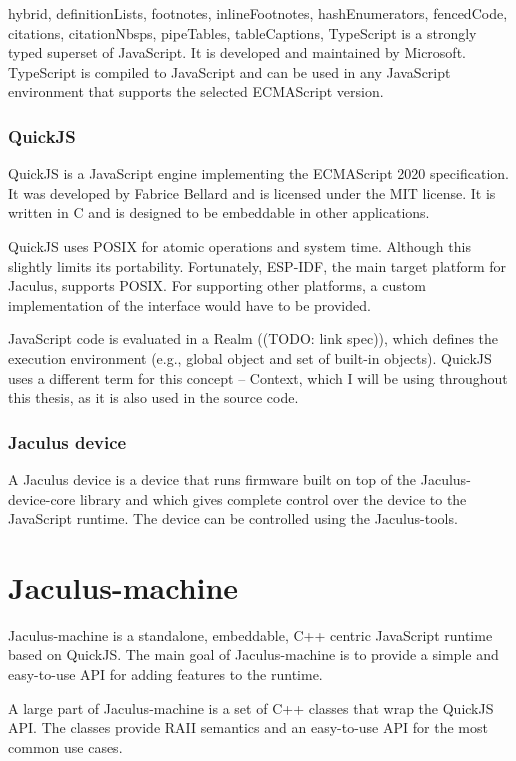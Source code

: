 \documentclass[
  digital,
  oneside,
  nosansbold,
  nocolorbold,
  lof,
  lot
]{fithesis4}
\begin{document}
\begin{markdown*}{%
  hybrid,
  definitionLists,
  footnotes,
  inlineFootnotes,
  hashEnumerators,
  fencedCode,
  citations,
  citationNbsps,
  pipeTables,
  tableCaptions,
}
TypeScript is a strongly typed superset of JavaScript. It is developed and maintained by Microsoft. TypeScript is compiled to JavaScript and can be used in any JavaScript environment that supports the selected ECMAScript version.


\subsection{QuickJS}

QuickJS is a JavaScript engine implementing the ECMAScript 2020 specification. It was developed by Fabrice Bellard and is licensed under the MIT license. It is written in C and is designed to be embeddable in other applications.

QuickJS uses POSIX for atomic operations and system time. Although this slightly limits its portability. Fortunately, ESP-IDF, the main target platform for Jaculus, supports POSIX. For supporting other platforms, a custom implementation of the interface would have to be provided.

JavaScript code is evaluated in a Realm ((TODO: link spec)), which defines the execution environment (e.g., global object and set of built-in objects). QuickJS uses a different term for this concept -- Context, which I will be using throughout this thesis, as it is also used in the source code.


\subsection{Jaculus device}

A Jaculus device is a device that runs firmware built on top of the Jaculus-device-core library and which gives complete control over the device to the JavaScript runtime. The device can be controlled using the Jaculus-tools.


\chapter{Jaculus-machine}

Jaculus-machine is a standalone, embeddable, C++ centric JavaScript runtime based on QuickJS. The main goal of Jaculus-machine is to provide a simple and easy-to-use API for adding features to the runtime.

A large part of Jaculus-machine is a set of C++ classes that wrap the QuickJS API. The classes provide RAII semantics and an easy-to-use API for the most common use cases.


\end{markdown*}
\end{document}
